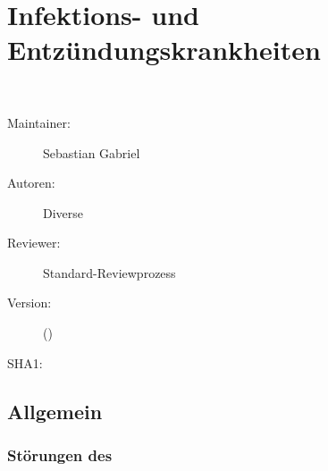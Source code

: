\def\ChapterCode{INK}
\chapter
[\CO{[INK]} Infektions- und Entzündungskrankheiten]
{Infektions- und Entzündungskrankheiten}
\label{chp:INK}

\ChapterIntro
{%
~~~
}
{%
\begin{description}
  \item[Maintainer:] Sebastian Gabriel
  \item[Autoren:] Diverse
  \item[Reviewer:] Standard-Reviewprozess
  \item[Version:] {\VarDocVersionTypeName} ({\VarDocVersionTypeDescription})
  \item[SHA1:] {\DocGitCommit}
\end{description}

{\TxTeilkapitelAASS}
}

\clearpage


\section{Allgemein}

\subsection{Störungen des }


